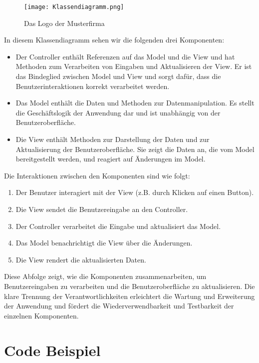 \begin{figure}[h]
\centering
\texttt{[image: Klassendiagramm.png]}
\caption{Das Logo der Musterfirma\footnotemark}
\end{figure}

In diesem Klassendiagramm sehen wir die folgenden drei Komponenten:

\begin{itemize}
\item Der Controller enthält Referenzen auf das Model und die View und hat Methoden zum Verarbeiten von Eingaben und Aktualisieren der View. Er ist das Bindeglied zwischen Model und View und sorgt dafür, dass die Benutzerinteraktionen korrekt verarbeitet werden.

\item Das Model enthält die Daten und Methoden zur Datenmanipulation. Es stellt die Geschäftslogik der Anwendung dar und ist unabhängig von der Benutzeroberfläche.

\item Die View enthält Methoden zur Darstellung der Daten und zur Aktualisierung der Benutzeroberfläche. Sie zeigt die Daten an, die vom Model bereitgestellt werden, und reagiert auf Änderungen im Model.
\end{itemize}

Die Interaktionen zwischen den Komponenten sind wie folgt:

\begin{enumerate}
\item Der Benutzer interagiert mit der View (z.B. durch Klicken auf einen Button).

\item Die View sendet die Benutzereingabe an den Controller.

\item Der Controller verarbeitet die Eingabe und aktualisiert das Model.

\item Das Model benachrichtigt die View über die Änderungen.

\item Die View rendert die aktualisierten Daten.
\end{enumerate}

Diese Abfolge zeigt, wie die Komponenten zusammenarbeiten, um Benutzereingaben zu verarbeiten und die Benutzeroberfläche zu aktualisieren. Die klare Trennung der Verantwortlichkeiten erleichtert die Wartung und Erweiterung der Anwendung und fördert die Wiederverwendbarkeit und Testbarkeit der einzelnen Komponenten.

\section{Code Beispiel}